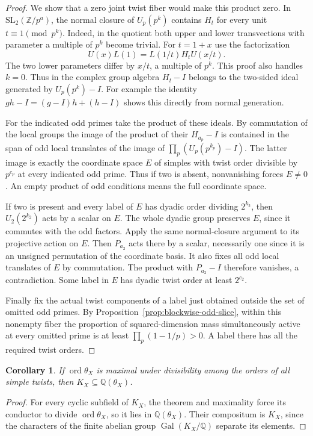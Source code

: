 \documentclass[11pt,a4paper]{article}
\numberwithin{equation}{section}
\newtheorem{corollary}[theorem]{Corollary}
\theoremstyle{remark}
\newcommand{\QQ}{\mathbb Q}
\begin{document}
\begin{proof}
We show that a zero joint twist fiber would make this product zero.
In $\mathrm{SL}_2(\mathbb Z/p^a)$, the normal closure of $U_p(p^k)$
contains $H_t$ for every unit $t\equiv1\pmod{p^k}$. Indeed,
in the quotient both upper and lower transvections with parameter
a multiple of $p^k$ become trivial. For $t=1+x$ use the factorization
\[
 U(x)L(1)=L(1/t)H_tU(x/t).
\]
The two lower parameters differ by $x/t$, a multiple of $p^k$.
This proof also handles $k=0$.
Thus in the complex group algebra $H_t-I$ belongs to the two-sided
ideal generated by $U_p(p^k)-I$. For example the identity
$gh-I=(g-I)h+(h-I)$ shows this directly from normal generation.

For the indicated odd primes take the product of these ideals.
By commutation of the local groups the image of the product of their
$H_{a_p}-I$ is contained in the span of odd local translates of the
image of $\prod_p(U_p(p^{k_p})-I)$. The latter image is exactly
the coordinate space $E$ of simples with twist order divisible by
$p^{c_p}$ at every indicated odd prime. Thus if two is absent,
nonvanishing forces $E\ne0$. An empty product of odd conditions
means the full coordinate space.

If two is present and every label of $E$ has dyadic order dividing
$2^{k_2}$, then $U_2(2^{k_2})$ acts by a scalar on $E$.
The whole dyadic group preserves $E$, since it commutes with the
odd factors. Apply the same normal-closure argument to its projective
action on $E$. Then $P_{a_2}$ acts there by a scalar, necessarily
one since it is an unsigned permutation of the coordinate basis.
It also fixes all odd local translates of $E$ by commutation.
The product with $P_{a_2}-I$ therefore vanishes, a contradiction.
Some label in $E$ has dyadic twist order at least $2^{c_2}$.

Finally fix the actual twist components of a label just obtained
outside the set of omitted odd primes. By Proposition~\ref{prop:blockwise-odd-slice},
within this nonempty fiber the proportion of squared-dimension
mass simultaneously active at every omitted prime is at least
$\prod_p(1-1/p)>0$. A label there has all the required twist orders.
\end{proof}

\begin{corollary}\label{found:C:7.2}
If $\operatorname{ord}\theta_X$ is maximal under divisibility among
the orders of all simple twists, then $K_X\subseteq\QQ(\theta_X)$.
\end{corollary}
\begin{proof}
For every cyclic subfield of $K_X$, the theorem and maximality force
its conductor to divide $\operatorname{ord}\theta_X$, so it lies in
$\QQ(\theta_X)$. Their compositum is $K_X$, since the characters of
the finite abelian group $\operatorname{Gal}(K_X/\QQ)$ separate its
elements.
\end{proof}
\end{document}
